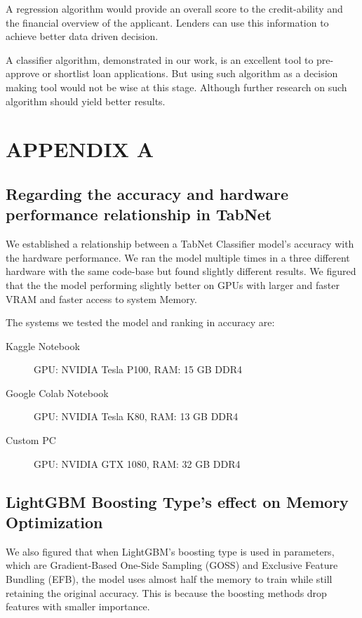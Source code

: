 \documentclass[sigconf, nonacm]{acmart}
\begin{document}
A regression algorithm would provide an overall score to the credit-ability and the financial overview of the applicant. Lenders can use this information to achieve better data driven decision.

A classifier algorithm, demonstrated in our work, is an excellent tool to pre-approve or shortlist loan applications. But using such algorithm as a decision making tool would not be wise at this stage. Although further research on such algorithm should yield better results.





\section*{APPENDIX A}
\subsection*{Regarding the accuracy and hardware performance relationship in TabNet}

We established a relationship between a TabNet Classifier model's accuracy with the hardware performance. We ran the model multiple times in a three different hardware with the same code-base but found slightly different results. We figured that the the model performing slightly better on GPUs with larger and faster VRAM and faster access to system Memory.

The systems we tested the model and ranking in accuracy are:
\begin{description}

    \item[Kaggle Notebook] GPU: NVIDIA Tesla P100, RAM: 15 GB DDR4
    \item[Google Colab Notebook] GPU: NVIDIA Tesla K80, RAM: 13 GB DDR4
    \item[Custom PC] GPU: NVIDIA GTX 1080, RAM: 32 GB DDR4
    
\end{description}

\subsection*{LightGBM Boosting Type's effect on Memory Optimization}

We also figured that when LightGBM's boosting type is used in parameters, which are Gradient-Based One-Side Sampling (GOSS) and Exclusive Feature Bundling (EFB), the model uses almost half the memory to train while still retaining the original accuracy. This is because the boosting methods drop features with smaller importance.
\end{document}
